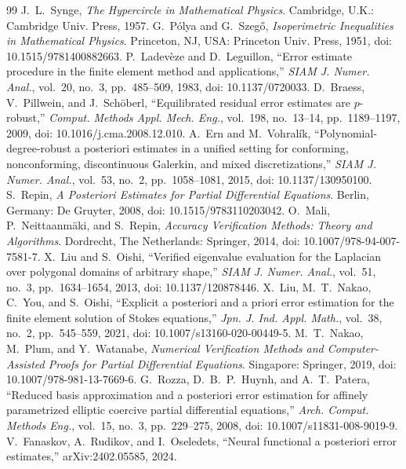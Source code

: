 \documentclass[11pt]{article}
\begin{document}
\begin{thebibliography}{99}
 J.~L.~Synge, \emph{The Hypercircle in Mathematical Physics}. Cambridge, U.K.: Cambridge Univ. Press, 1957.
 G.~P\'olya and G.~Szeg\H{o}, \emph{Isoperimetric Inequalities in Mathematical Physics}. Princeton, NJ, USA: Princeton Univ. Press, 1951, doi: 10.1515/9781400882663.
 P.~Ladev\`eze and D.~Leguillon, ``Error estimate procedure in the finite element method and applications,'' \emph{SIAM J. Numer. Anal.}, vol.~20, no.~3, pp.~485--509, 1983, doi: 10.1137/0720033.
 D.~Braess, V.~Pillwein, and J.~Sch\"oberl, ``Equilibrated residual error estimates are $p$-robust,'' \emph{Comput. Methods Appl. Mech. Eng.}, vol.~198, no.~13--14, pp.~1189--1197, 2009, doi: 10.1016/j.cma.2008.12.010.
 A.~Ern and M.~Vohral\'ik, ``Polynomial-degree-robust a posteriori estimates in a unified setting for conforming, nonconforming, discontinuous Galerkin, and mixed discretizations,'' \emph{SIAM J. Numer. Anal.}, vol.~53, no.~2, pp.~1058--1081, 2015, doi: 10.1137/130950100.
 S.~Repin, \emph{A Posteriori Estimates for Partial Differential Equations}. Berlin, Germany: De Gruyter, 2008, doi: 10.1515/9783110203042.
 O.~Mali, P.~Neittaanm\"aki, and S.~Repin, \emph{Accuracy Verification Methods: Theory and Algorithms}. Dordrecht, The Netherlands: Springer, 2014, doi: 10.1007/978-94-007-7581-7.
 X.~Liu and S.~Oishi, ``Verified eigenvalue evaluation for the Laplacian over polygonal domains of arbitrary shape,'' \emph{SIAM J. Numer. Anal.}, vol.~51, no.~3, pp.~1634--1654, 2013, doi: 10.1137/120878446.
 X.~Liu, M.~T.~Nakao, C.~You, and S.~Oishi, ``Explicit a posteriori and a priori error estimation for the finite element solution of Stokes equations,'' \emph{Jpn. J. Ind. Appl. Math.}, vol.~38, no.~2, pp.~545--559, 2021, doi: 10.1007/s13160-020-00449-5.
 M.~T.~Nakao, M.~Plum, and Y.~Watanabe, \emph{Numerical Verification Methods and Computer-Assisted Proofs for Partial Differential Equations}. Singapore: Springer, 2019, doi: 10.1007/978-981-13-7669-6.
 G.~Rozza, D.~B.~P.~Huynh, and A.~T.~Patera, ``Reduced basis approximation and a posteriori error estimation for affinely parametrized elliptic coercive partial differential equations,'' \emph{Arch. Comput. Methods Eng.}, vol.~15, no.~3, pp.~229--275, 2008, doi: 10.1007/s11831-008-9019-9.
 V.~Fanaskov, A.~Rudikov, and I.~Oseledets, ``Neural functional a posteriori error estimates,'' arXiv:2402.05585, 2024.

\end{thebibliography}
\end{document}

